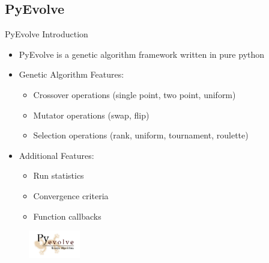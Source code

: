 \subsection{PyEvolve}
\begin{frame}{PyEvolve Introduction}
	\begin{itemize}
  \small
  \item PyEvolve is a genetic algorithm framework written in pure python
  \item Genetic Algorithm Features:
    \begin{itemize}
      \item Crossover operations (single point, two point, uniform)
      \item Mutator operations (swap, flip)
      \item Selection operations (rank, uniform, tournament, roulette)
    \end{itemize}
  \item Additional Features:
    \begin{itemize}
      \item Run statistics
      \item Convergence criteria
      \item Function callbacks
    \end{itemize}
  \end{itemize}
  \begin{figure}
    \includegraphics[width=0.2\textwidth]{PyEvolveLogo.png}
  \end{figure}
\end{frame}
